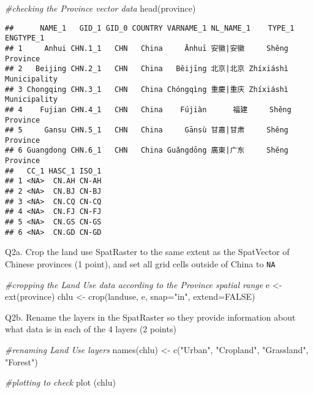 \documentclass[
]{article}
\newenvironment{Shaded}{\begin{snugshade}}{\end{snugshade}}
\newcommand{\AttributeTok}[1]{\textcolor[rgb]{0.77,0.63,0.00}{#1}}
\newcommand{\CommentTok}[1]{\textcolor[rgb]{0.56,0.35,0.01}{\textit{#1}}}
\newcommand{\ConstantTok}[1]{\textcolor[rgb]{0.00,0.00,0.00}{#1}}
\newcommand{\FunctionTok}[1]{\textcolor[rgb]{0.00,0.00,0.00}{#1}}
\newcommand{\NormalTok}[1]{#1}
\newcommand{\OtherTok}[1]{\textcolor[rgb]{0.56,0.35,0.01}{#1}}
\newcommand{\StringTok}[1]{\textcolor[rgb]{0.31,0.60,0.02}{#1}}
\begin{document}
\begin{Shaded}
\begin{Highlighting}[]
\CommentTok{\#checking the Province vector data}
\FunctionTok{head}\NormalTok{(province)}
\end{Highlighting}
\end{Shaded}

\begin{verbatim}
##      NAME_1   GID_1 GID_0 COUNTRY VARNAME_1 NL_NAME_1    TYPE_1    ENGTYPE_1
## 1     Anhui CHN.1_1   CHN   China     Ānhuī 安徽|安徽     Shěng     Province
## 2   Beijing CHN.2_1   CHN   China   Běijīng 北京|北京 Zhíxiáshì Municipality
## 3 Chongqing CHN.3_1   CHN   China Chóngqìng 重慶|重庆 Zhíxiáshì Municipality
## 4    Fujian CHN.4_1   CHN   China    Fújiàn      福建     Shěng     Province
## 5     Gansu CHN.5_1   CHN   China     Gānsù 甘肅|甘肃     Shěng     Province
## 6 Guangdong CHN.6_1   CHN   China Guǎngdōng 廣東|广东     Shěng     Province
##   CC_1 HASC_1 ISO_1
## 1 <NA>  CN.AH CN-AH
## 2 <NA>  CN.BJ CN-BJ
## 3 <NA>  CN.CQ CN-CQ
## 4 <NA>  CN.FJ CN-FJ
## 5 <NA>  CN.GS CN-GS
## 6 <NA>  CN.GD CN-GD
\end{verbatim}

Q2a. Crop the land use SpatRaster to the same extent as the SpatVector
of Chinese provinces (1 point), and set all grid cells outside of China
to \texttt{NA}

\begin{Shaded}
\begin{Highlighting}[]
\CommentTok{\#cropping the Land Use data according to the Province spatial range}
\NormalTok{e }\OtherTok{\textless{}{-}} \FunctionTok{ext}\NormalTok{(province)}
\NormalTok{chlu }\OtherTok{\textless{}{-}} \FunctionTok{crop}\NormalTok{(landuse, e, }\AttributeTok{snap=}\StringTok{"in"}\NormalTok{, }\AttributeTok{extend=}\ConstantTok{FALSE}\NormalTok{)}
\end{Highlighting}
\end{Shaded}

Q2b. Rename the layers in the SpatRaster so they provide information
about what data is in each of the 4 layers (2 points)

\begin{Shaded}
\begin{Highlighting}[]
\CommentTok{\#renaming Land Use layers}
\FunctionTok{names}\NormalTok{(chlu) }\OtherTok{\textless{}{-}} \FunctionTok{c}\NormalTok{(}\StringTok{"Urban"}\NormalTok{, }\StringTok{"Cropland"}\NormalTok{, }\StringTok{"Grassland"}\NormalTok{, }\StringTok{"Forest"}\NormalTok{)}

\CommentTok{\#plotting to check}
\FunctionTok{plot}\NormalTok{ (chlu)}
\end{Highlighting}
\end{Shaded}
\end{document}
